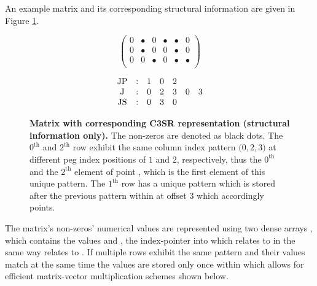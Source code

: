\documentclass{article}
\begin{document}
    An example matrix and its corresponding structural information are given in Figure \ref{fig:c3sr_example_structure}.

    \begin{figure}[ht]
      \centering
      \begin{minipage}{0.4\textwidth}
        \centering
        $$
        \begin{pmatrix}
          0 & \bullet & 0 & \bullet & \bullet & 0 \\
          0 & \bullet & 0 & 0 & \bullet & 0 \\
          0 & 0 & \bullet & 0 & \bullet & \bullet \\
        \end{pmatrix}
        $$
      \end{minipage}
      \begin{minipage}{0.4\textwidth}
        \centering
        $$
        \begin{matrix}
          \JP & : & 1 & 0 & 2 &   &   \\
           \J & : & 0 & 2 & 3 & 0 & 3 \\
          \JS & : & 0 & 3 & 0 &   &   \\
        \end{matrix}
        $$
      \end{minipage}
      \caption[Matrix with corresponding C3SR representation (structural information only).]{\textbf{Matrix with corresponding C3SR representation (structural information only).} The non-zeros are denoted as black dots. The $0^{\text{th}}$ and $2^{\text{th}}$ row exhibit the same column index pattern $\big(0,2,3\big)$ at different peg index positions of $1$ and $2$, respectively, thus the $0^{\text{th}}$ and the $2^{\text{th}}$ element of \JS point \J[0], which is the first element of this unique pattern. The $1^{\text{th}}$ row has a unique pattern which is stored after the previous pattern within \J at offset $3$ which \JS[1] accordingly points.}
      \label{fig:c3sr_example_structure}
    \end{figure}

    The matrix's non-zeros' numerical values are represented using two dense arrays \V, which contains the values and \VS, the index-pointer into \V which relates to \V in the same way \JS relates to \J. If multiple rows exhibit the same pattern and their values match at the same time the values are stored only once within \V which allows for efficient matrix-vector multiplication schemes shown below.
\end{document}
